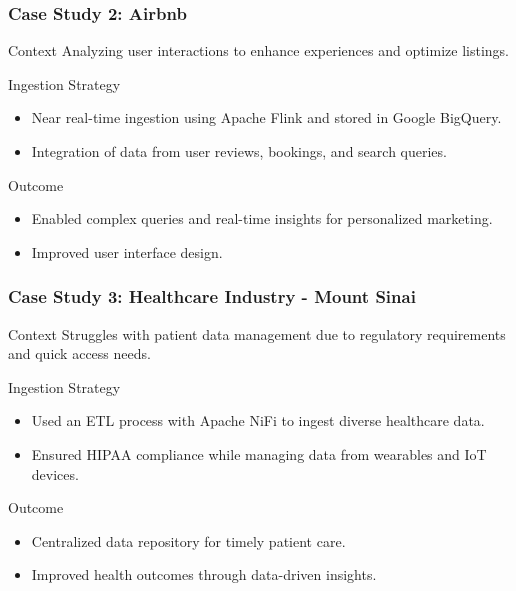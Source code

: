 \documentclass[aspectratio=169]{beamer}
\begin{document}
\begin{frame}[fragile]
    \frametitle{Case Study 2: Airbnb}
    \begin{block}{Context}
        Analyzing user interactions to enhance experiences and optimize listings.
    \end{block}
    \begin{block}{Ingestion Strategy}
        \begin{itemize}
            \item Near real-time ingestion using Apache Flink and stored in Google BigQuery.
            \item Integration of data from user reviews, bookings, and search queries.
        \end{itemize}
    \end{block}
    \begin{block}{Outcome}
        \begin{itemize}
            \item Enabled complex queries and real-time insights for personalized marketing.
            \item Improved user interface design.
        \end{itemize}
    \end{block}
\end{frame}

\begin{frame}[fragile]
    \frametitle{Case Study 3: Healthcare Industry - Mount Sinai}
    \begin{block}{Context}
        Struggles with patient data management due to regulatory requirements and quick access needs.
    \end{block}
    \begin{block}{Ingestion Strategy}
        \begin{itemize}
            \item Used an ETL process with Apache NiFi to ingest diverse healthcare data.
            \item Ensured HIPAA compliance while managing data from wearables and IoT devices.
        \end{itemize}
    \end{block}
    \begin{block}{Outcome}
        \begin{itemize}
            \item Centralized data repository for timely patient care.
            \item Improved health outcomes through data-driven insights.
        \end{itemize}
    \end{block}
\end{frame}
\end{document}

